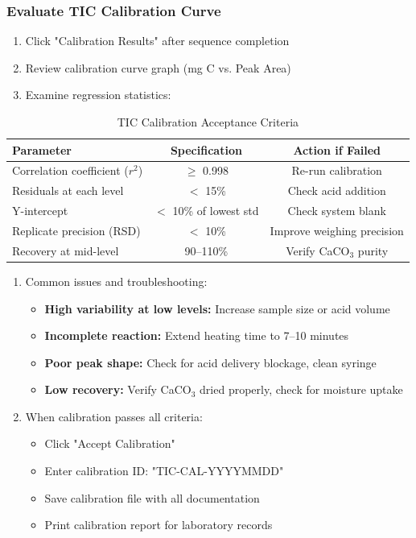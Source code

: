 \documentclass[11pt,a4paper]{article}\usepackage[]{graphicx}\usepackage[]{xcolor}
\begin{document}
\subsubsection{Evaluate TIC Calibration Curve}
\begin{enumerate}[noitemsep]
    \item Click "Calibration Results" after sequence completion
    \item Review calibration curve graph (mg C vs. Peak Area)
    \item Examine regression statistics:
\end{enumerate}

\begin{table}[h]
\centering
\begin{tabular}{lcc}
\toprule
\textbf{Parameter} & \textbf{Specification} & \textbf{Action if Failed} \\
\midrule
Correlation coefficient ($r^2$) & $\geq$ 0.998 & Re-run calibration \\
Residuals at each level & $<$ 15\% & Check acid addition \\
Y-intercept & $<$ 10\% of lowest std & Check system blank \\
Replicate precision (RSD) & $<$ 10\% & Improve weighing precision \\
Recovery at mid-level & 90--110\% & Verify CaCO$_3$ purity \\
\bottomrule
\end{tabular}
\caption{TIC Calibration Acceptance Criteria}
\end{table}

\begin{enumerate}[noitemsep]
    \item Common issues and troubleshooting:
    \begin{itemize}
        \item \textbf{High variability at low levels:} Increase sample size or acid volume
        \item \textbf{Incomplete reaction:} Extend heating time to 7--10 minutes
        \item \textbf{Poor peak shape:} Check for acid delivery blockage, clean syringe
        \item \textbf{Low recovery:} Verify CaCO$_3$ dried properly, check for moisture uptake
    \end{itemize}
    \item When calibration passes all criteria:
    \begin{itemize}
        \item Click "Accept Calibration"
        \item Enter calibration ID: "TIC-CAL-YYYYMMDD"
        \item Save calibration file with all documentation
        \item Print calibration report for laboratory records
    \end{itemize}
\end{enumerate}
\end{document}
